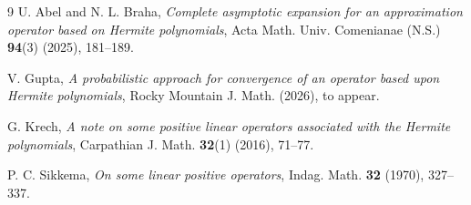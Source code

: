 \documentclass[10pt,a4paper]{amsart}
\begin{document}
\bigskip

%
%

\begin{thebibliography}{9}
U. Abel and N. L. Braha, 
\emph{Complete asymptotic expansion for an approximation operator based on Hermite polynomials}, 
Acta Math. Univ. Comenianae (N.S.) \textbf{94}(3) (2025), 181--189.

V. Gupta, 
\emph{A probabilistic approach for convergence of an operator based upon Hermite polynomials}, 
Rocky Mountain J. Math. (2026), to appear.

G. Krech, 
\emph{A note on some positive linear operators associated with the Hermite polynomials}, 
Carpathian J. Math. \textbf{32}(1) (2016), 71--77.

P. C. Sikkema, 
\emph{On some linear positive operators}, 
Indag. Math. \textbf{32} (1970), 327--337.
%
%
%
\end{thebibliography}
\end{document}
